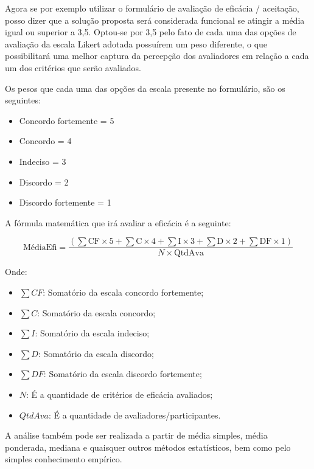 Agora se por exemplo utilizar o formulário de avaliação de eficácia / aceitação, posso dizer que a solução proposta será considerada funcional se atingir a média igual ou superior a 3,5. Optou-se por 3,5 pelo fato de cada uma das opções de avaliação da escala Likert adotada possuírem um peso diferente, o que possibilitará uma melhor captura da percepção dos avaliadores em relação a cada um dos critérios que serão avaliados.

Os pesos que cada uma das opções da escala presente no formulário, são os seguintes:
\begin{itemize}
    \item Concordo fortemente = 5
    \item Concordo = 4
    \item Indeciso = 3
    \item Discordo = 2
    \item Discordo fortemente = 1
\end{itemize}

A fórmula matemática que irá avaliar a eficácia é a seguinte:

\begin{equation}
\text{MédiaEfi} = \frac{(\sum \text{CF} \times 5 + \sum \text{C} \times 4 + \sum \text{I} \times 3 + \sum \text{D} \times 2 + \sum \text{DF} \times 1)}{N \times \text{QtdAva}}
\end{equation}

Onde: 
\begin{itemize}
    \item $\sum CF$: Somatório da escala concordo fortemente;
    \item $\sum C$: Somatório da escala concordo;
    \item $\sum I$: Somatório da escala indeciso;
    \item $\sum D$: Somatório da escala discordo;
    \item $\sum DF$: Somatório da escala discordo fortemente;
    \item $N$: É a quantidade de critérios de eficácia avaliados;
    \item $QtdAva$: É a quantidade de avaliadores/participantes.
\end{itemize}

A análise também pode ser realizada a partir de média simples, média ponderada, mediana e quaisquer outros métodos estatísticos, bem como pelo simples conhecimento empírico.







